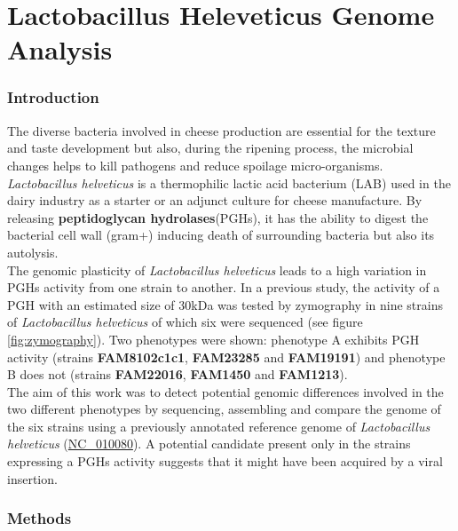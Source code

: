 \documentclass[10pt,a4paper]{article}
\begin{document}
\newpage
\part*{Lactobacillus Heleveticus Genome Analysis}
\section*{Introduction}

The diverse bacteria involved in cheese production are essential for the texture and taste development but also, during the ripening process, the microbial changes helps to kill pathogens and reduce spoilage micro-organisms. \textit{Lactobacillus helveticus} is a thermophilic lactic acid bacterium (LAB) used in the dairy industry as a starter or an adjunct culture for cheese manufacture\cite{jebava_nine_2011}. By releasing \textbf{peptidoglycan hydrolases}(PGHs), it has the ability to digest the bacterial cell wall (gram+) inducing death of surrounding bacteria but also its autolysis. \\

The genomic plasticity of \textit{Lactobacillus helveticus} leads to a high variation in PGHs activity from one strain to another. In a previous study, the activity of a PGH with an estimated size of 30kDa was tested by zymography in nine strains of \textit{Lactobacillus helveticus} of which six were sequenced (see figure \ref{fig:zymography}). Two phenotypes were shown: phenotype A exhibits PGH activity (strains \textbf{FAM8102c1c1}, \textbf{FAM23285} and \textbf{FAM19191}) and phenotype B does not (strains \textbf{FAM22016}, \textbf{FAM1450} and \textbf{FAM1213}).\\

The aim of this work was to detect potential genomic differences involved in the two different phenotypes by sequencing, assembling and compare the genome of the six strains using a previously annotated reference genome of \textit{Lactobacillus helveticus} (\href{https://www.ncbi.nlm.nih.gov/genome/?term=NC_010080}{NC\_010080}). A potential candidate present only in the strains expressing a PGHs activity suggests that it might have been acquired by a viral insertion. 

  


\section*{Methods}
\end{document}
